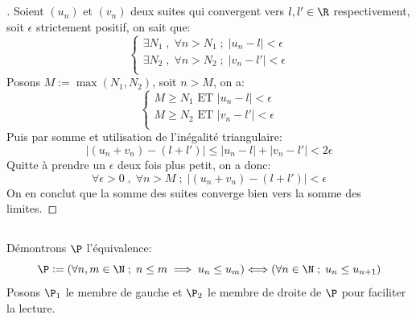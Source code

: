 \subsection[Somme de suites convergentes]{}
\begin{proof}[\unskip\nopunct]
   Soient \((u_n)\) et \((v_n)\) deux suites qui convergent vers \(l, l' \in \R\) respectivement, soit \(\epsilon\) strictement positif, on sait que:
   \[
   \begin{cases}
         \exists N_1 \; , \; \forall n > N_1 \; ; \; |u_n - l| < \epsilon\\
         \exists N_2 \; , \; \forall n > N_2 \; ; \; |v_n - l'| < \epsilon\\
   \end{cases}
   \]
   Posons \(M := \max(N_1, N_2)\), soit \(n > M\), on a:
   \[
   \begin{cases}
         M \geq N_1 \text{ ET } |u_n - l| < \epsilon\\
         M \geq N_2 \text{ ET }|v_n - l'| < \epsilon\\
   \end{cases}
   \]
   Puis par somme et utilisation de l'inégalité triangulaire:
   \[
      |(u_n + v_n) - (l + l')| \leq |u_n - l| + |v_n - l'| < 2 \epsilon
   \]
   Quitte à prendre un \(\epsilon\) deux fois plus petit, on a donc:
   \[
      \forall \epsilon > 0 \; , \; \forall n > M \; ; \; |(u_n + v_n) - (l + l')| < \epsilon
   \]
   On en conclut que la somme des suites converge bien vers la somme des limites.
   
\end{proof}

\subsection[Caractérisation des suites croissantes]{}
Démontrons \(\P\) l'équivalence:
\[
\P := (\forall n,m \in \N\; ; \; n \leq m \implies u_n \leq u_m) \Longleftrightarrow (\forall n \in \N\; ; \; u_n \leq u_{n+1})
\]
Posons \(\P_1\) le membre de gauche et \(\P_2\) le membre de droite de \(\P\) pour faciliter la lecture.

